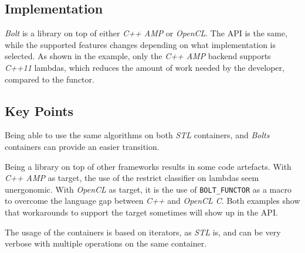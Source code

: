 \subsection{Implementation}
\textit{Bolt} is a library on top of either \textit{C++ AMP} or \textit{OpenCL}\cite{boltPresentation}. The API is the same, while the supported features changes depending on what implementation is selected.
As shown in the example, only the \textit{C++ AMP} backend supports \textit{C++11} lambdas, which reduces the amount of work needed by the developer, compared to the functor.

\subsection{Key Points}
Being able to use the same algorithms on both \textit{STL} containers, and \textit{Bolts} containers can provide an easier transition.

Being a library on top of other frameworks results in some code artefacts. With \textit{C++ AMP} as target, the use of the restrict classifier on lambdas seem unergonomic. With \textit{OpenCL} as target, it is the use of \texttt{BOLT\_FUNCTOR} as a macro to overcome the language gap between \textit{C++} and \textit{OpenCL C}. Both examples show that workarounds to support the target sometimes will show up in the API. 

The usage of the containers is based on iterators, as \textit{STL} is, and can be very verbose with multiple operations on the same container.
